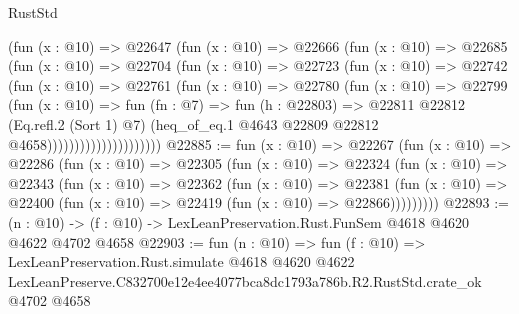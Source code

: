 \begin{lexlean}{RustStd}
\begin{coremodule}
                        (fun (x : @10) =>
                        @22647
                          (fun (x : @10) =>
                          @22666
                            (fun (x : @10) =>
                            @22685
                              (fun (x : @10) =>
                              @22704
                                (fun (x : @10) =>
                                @22723
                                  (fun (x : @10) =>
                                  @22742
                                    (fun (x : @10) =>
                                    @22761
                                      (fun (x : @10) =>
                                      @22780
                                        (fun (x : @10) =>
                                        @22799
                                          (fun (x : @10) =>
                                          fun (fn : @7) =>
                                          fun (h : @22803) =>
                                          @22811
                                            @22812
                                            (Eq.refl.{2} (Sort 1) @7)
                                            (heq_of_eq.{1}
                                              @4643
                                              @22809
                                              @22812
                                              @4658)))))))))))))))))))))
@22885 := fun (x : @10) =>
  @22267
    (fun (x : @10) =>
    @22286
      (fun (x : @10) =>
      @22305
        (fun (x : @10) =>
        @22324
          (fun (x : @10) =>
          @22343
            (fun (x : @10) =>
            @22362
              (fun (x : @10) =>
              @22381
                (fun (x : @10) => @22400 (fun (x : @10) => @22419 (fun (x : @10) => @22866)))))))))
@22893 := (n : @10) -> (f : @10) -> LexLeanPreservation.Rust.FunSem @4618 @4620 @4622 @4702 @4658
@22903 := fun (n : @10) =>
  fun (f : @10) =>
  LexLeanPreservation.Rust.simulate
    @4618
    @4620
    @4622
    LexLeanPreserve.C832700e12e4ee4077bca8dc1793a786b.R2.RustStd.crate_ok
    @4702
    @4658
\end{coremodule}
\end{lexlean}
